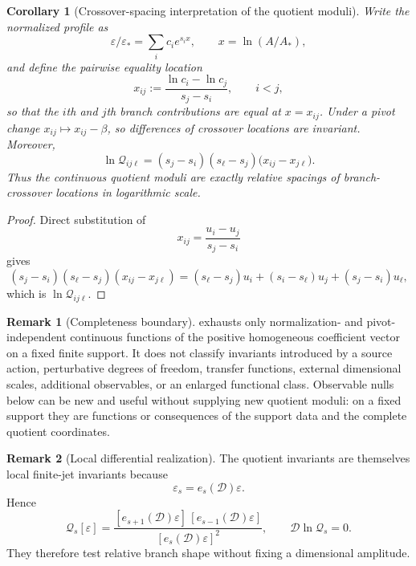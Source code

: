 \documentclass[aps,prd,reprint,onecolumn,nofootinbib,superscriptaddress,showkeys]{revtex4-2}
\numberwithin{equation}{section}
\theoremstyle{definition}
\newtheorem{remark}{Remark}[section]
\theoremstyle{plain}
\newtheorem{corollary}{Corollary}[section]
\newcommand{\Dil}{\mathscr D}
\begin{document}
\begin{corollary}[Crossover-spacing interpretation of the quotient moduli]\label{cor:crossover-moduli}
Write the normalized profile as
\[
\varepsilon/\varepsilon_*=\sum_i c_i e^{s_ix},
\qquad x=\ln(A/A_*),
\]
and define the pairwise equality location
\begin{equation}
 x_{ij}:=\frac{\ln c_i-\ln c_j}{s_j-s_i},
 \qquad i<j,
\end{equation}
so that the $i$th and $j$th branch contributions are equal at $x=x_{ij}$.  Under a pivot change $x_{ij}\mapsto x_{ij}-\beta$, so differences of crossover locations are invariant.  Moreover,
\begin{equation}
\boxed{
\ln\mathcal Q_{ij\ell}
=(s_j-s_i)(s_\ell-s_j)
\bigl(x_{ij}-x_{j\ell}\bigr).
}
\end{equation}
Thus the continuous quotient moduli are exactly relative spacings of branch-crossover locations in logarithmic scale.
\end{corollary}

\begin{proof}
Direct substitution of
\[
x_{ij}=\frac{u_i-u_j}{s_j-s_i}
\]
gives
\[
(s_j-s_i)(s_\ell-s_j)(x_{ij}-x_{j\ell})
=(s_\ell-s_j)u_i+(s_i-s_\ell)u_j+(s_j-s_i)u_\ell,
\]
which is $\ln\mathcal Q_{ij\ell}$.
\end{proof}

\begin{remark}[Completeness boundary]
 exhausts only normalization- and pivot-independent continuous functions of the positive homogeneous coefficient vector on a fixed finite support.  It does not classify invariants introduced by a source action, perturbative degrees of freedom, transfer functions, external dimensional scales, additional observables, or an enlarged functional class.  Observable nulls below can be new and useful without supplying new quotient moduli: on a fixed support they are functions or consequences of the support data and the complete quotient coordinates.
\end{remark}

\begin{remark}[Local differential realization]
The quotient invariants are themselves local finite-jet invariants because
\[
\varepsilon_s=e_s(\Dil)\varepsilon.
\]
Hence
\begin{equation}
\boxed{
\mathcal Q_s[\varepsilon]
=
\frac{
[e_{s+1}(\Dil)\varepsilon]\,[e_{s-1}(\Dil)\varepsilon]
}{
[e_s(\Dil)\varepsilon]^2
},
\qquad
\Dil\ln\mathcal Q_s=0.
}
\end{equation}
They therefore test relative branch shape without fixing a dimensional amplitude.
\end{remark}
\end{document}
